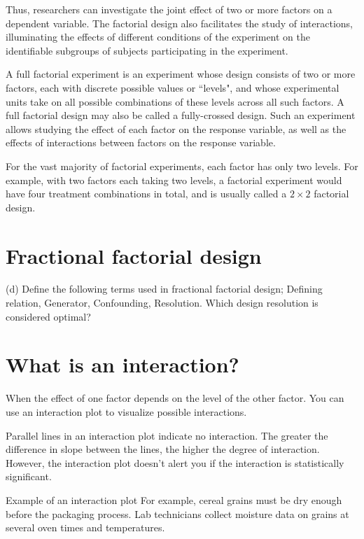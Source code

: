 \documentclass[]{article}
\begin{document}
Thus, researchers can investigate the joint effect of two or more factors on a dependent variable. The factorial design also facilitates the study of interactions, illuminating the effects of different conditions of the experiment on the identifiable subgroups of subjects participating in the experiment.


A full factorial experiment is an experiment whose design consists of two or more factors, each with discrete possible values or ``levels", and whose experimental units take on all possible combinations of these levels across all such factors. A full factorial design may also be called a fully-crossed design. Such an experiment allows studying the effect of each factor on the response variable, as well as the effects of interactions between factors on the response variable.

For the vast majority of factorial experiments, each factor has only two levels. For example, with two factors each taking two levels, a factorial experiment would have four treatment combinations in total, and is usually called a $2\times2$ factorial design.

\newpage


\section{Fractional factorial design}

(d)	Define the following terms used in fractional factorial design; Defining relation,
Generator, Confounding, Resolution. Which design resolution is considered
optimal?




\section{What is an interaction?}


When the effect of one factor depends on the level of the other factor. You can use an interaction plot to visualize possible interactions.

Parallel lines in an interaction plot indicate no interaction. The greater the difference in slope between the lines, the higher the degree of interaction. However, the interaction plot doesn't alert you if the interaction is statistically significant.

Example of an interaction plot
For example, cereal grains must be dry enough before the packaging process. Lab technicians collect moisture data on grains at several oven times and temperatures.
\end{document}
